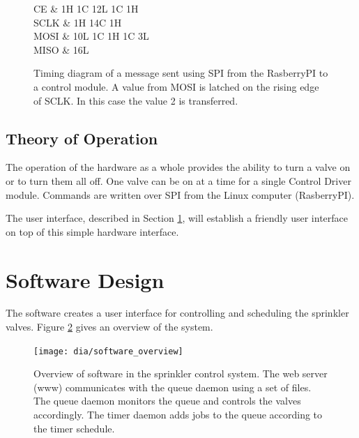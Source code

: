 \documentclass{article}
\begin{document}
\begin{figure}[h!]
\begin{center}
\begin{tikztimingtable}
	[xscale=2.0, yscale=2.0]
	CE	 & {1H} 1{C} {12L} 1{C} {1H} \\
	SCLK & {1H} 14{C} {1H} \\
	MOSI & 10L 1{C} 1{H} 1{C} 3L \\
	MISO & 16L \\
\end{tikztimingtable}
\end{center}
\caption{Timing diagram of a message sent using SPI from
the RasberryPI to a control module.
A value from MOSI is latched on the rising edge of SCLK.
In this case the value 2 is transferred.}
\label{fig:timing}
\end{figure}

\FloatBarrier
\subsection{Theory of Operation}


The operation of the hardware as a whole provides the ability to
turn a valve on or to turn them all off.
One valve can be on at a time for a single Control Driver module.
Commands are written over SPI from the Linux computer (RasberryPI).

The user interface, described in Section \ref{sec:swdesign}, will
establish a friendly user interface on top of this simple hardware
interface.



\FloatBarrier
\section{Software Design}
\label{sec:swdesign}

The software creates a user interface for controlling
and scheduling the sprinkler valves.
Figure \ref{fig:swoview} gives an overview of the system.

\begin{figure}[htbp!]
\begin{center}
\texttt{[image: dia/software\_overview]}
\end{center}
\caption{Overview of software in the sprinkler control system.
The web server (www) communicates with the queue daemon
using a set of files.
The queue daemon monitors the queue and controls the valves accordingly.
The timer daemon adds jobs to the queue according to the timer schedule.}
\label{fig:swoview}
\end{figure}
\end{document}
